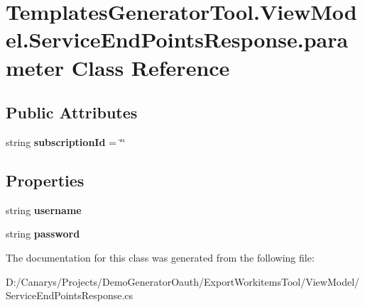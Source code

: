 \hypertarget{class_templates_generator_tool_1_1_view_model_1_1_service_end_points_response_1_1parameter}{}\section{Templates\+Generator\+Tool.\+View\+Model.\+Service\+End\+Points\+Response.\+parameter Class Reference}
\label{class_templates_generator_tool_1_1_view_model_1_1_service_end_points_response_1_1parameter}
\subsection*{Public Attributes}
\begin{DoxyCompactItemize}
\item 
\mbox{\label{class_templates_generator_tool_1_1_view_model_1_1_service_end_points_response_1_1parameter_ae65bda60fc4cabb303817f5b4ab29772}} 
string {\bfseries subscription\+Id} = \char`\"{}\char`\"{}
\end{DoxyCompactItemize}
\subsection*{Properties}
\begin{DoxyCompactItemize}
\item 
\mbox{\label{class_templates_generator_tool_1_1_view_model_1_1_service_end_points_response_1_1parameter_a969b6b3f173d72d7fb3f12a2059a602b}} 
string {\bfseries username}
\item 
\mbox{\label{class_templates_generator_tool_1_1_view_model_1_1_service_end_points_response_1_1parameter_aa19b7de451aebcd7a4dbb1ec29de9cc9}} 
string {\bfseries password}
\end{DoxyCompactItemize}


The documentation for this class was generated from the following file\+:\begin{DoxyCompactItemize}
\item 
D\+:/\+Canarys/\+Projects/\+Demo\+Generator\+Oauth/\+Export\+Workitems\+Tool/\+View\+Model/Service\+End\+Points\+Response.\+cs\end{DoxyCompactItemize}
